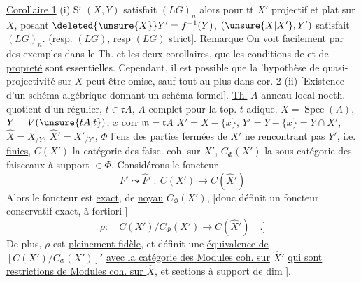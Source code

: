 \uline{Corollaire 1}   (i) Si $(X,Y)$ satisfait $(LG)_n$   alors pour tt $X'$ projectif et plat sur $X$, posant $\deleted{\unsure{X}}Y'=f^{-1}(Y)$, $(\unsure{X|X'},Y')$ satisfait $(LG)_n$.  (resp. $(LG)$, resp $(LG)$ strict].
\uline{Remarque} On voit facilement par des exemples dans le Th. et les deux corollaires, que les conditions de  et de \uline{propreté} sont essentielles. Cependant, il  est possible que la 'hypothèse de quasi-projectivité sur $X$   peut être omise,  sauf tout au plus dans cor. 2 (ii) [Existence d'un schéma algébrique donnant un schéma formel].
\uline{Th.} $A$ anneau local noeth. quotient d'un régulier, $t\in\mathfrak{r} A$, $A$ complet pour la top. $t$-adique. $X=\operatorname{Spec}(A)$, $Y=V(\unsure{tA|t})$, $x$ corr $\mathfrak{m}=\mathfrak{r} A$ $X'=X-\{x\}$, $Y'=Y-\{x\}=Y\cap X'$, $\widehat X=X_{/Y}$, $\widehat X'=X'_{/Y'}$, $\Phi$ l'ens des parties fermées de $X'$ ne rencontrant pas $Y'$, i.e. \uline{finies}, $C(X')$ la catégorie des faisc. coh. sur $X'$, $C_\Phi(X')$ la sous-catégorie des faisceaux à support $\in\Phi$. Considérons le foncteur 
\[
 F'\leadsto\widehat F'\ :\ C(X')\longrightarrow C(\widehat X')
\]
Alors le foncteur est \uline{exact}, de \uline{noyau} $C_\Phi(X')$, [donc définit un foncteur conservatif exact, à fortiori ]
\[
 \rho:\quad C(X')/C_\Phi(X')\longrightarrow C(\widehat X')\quad\text{.]}
\]
De plus, $\rho$ est \uline{pleinement fidèle},  et définit une \uline{équivalence de} $[C(X')/C_\Phi(X')]'$ \uline{avec la catégorie des Modules coh. sur} $\widehat X'$ \uline{qui sont}  \uline{restrictions de Modules coh. sur $\widehat X$}, et    sections   à support de dim ].

